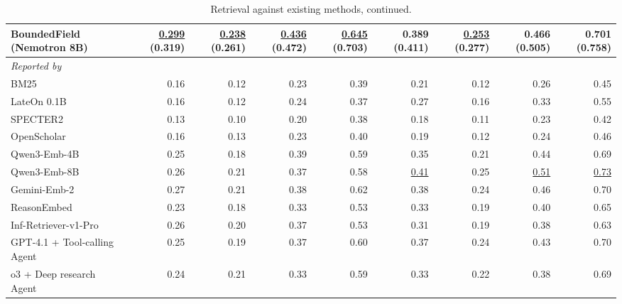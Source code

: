\begin{table}[t]
\begin{subtable}{\textwidth}
\begin{tabular}{lrrrrrrrr}
BoundedField (Nemotron 8B) & \underline{\textbf{0.299}} (0.319) & \underline{\textbf{0.238}} (0.261) & \underline{\textbf{0.436}} (0.472) & \underline{\textbf{0.645}} (0.703) & \textbf{0.389} (0.411) & \underline{\textbf{0.253}} (0.277) & \textbf{0.466} (0.505) & \textbf{0.701} (0.758) \\
\midrule
\multicolumn{9}{l}{\textit{Reported by \citet{kim2026scholarcatalyst}}} \\
BM25 & 0.16 & 0.12 & 0.23 & 0.39 & 0.21 & 0.12 & 0.26 & 0.45 \\
LateOn 0.1B & 0.16 & 0.12 & 0.24 & 0.37 & 0.27 & 0.16 & 0.33 & 0.55 \\
SPECTER2 & 0.13 & 0.10 & 0.20 & 0.38 & 0.18 & 0.11 & 0.23 & 0.42 \\
OpenScholar & 0.16 & 0.13 & 0.23 & 0.40 & 0.19 & 0.12 & 0.24 & 0.46 \\
Qwen3-Emb-4B & 0.25 & 0.18 & 0.39 & 0.59 & 0.35 & 0.21 & 0.44 & 0.69 \\
Qwen3-Emb-8B & 0.26 & 0.21 & 0.37 & 0.58 & \underline{0.41} & 0.25 & \underline{0.51} & \underline{0.73} \\
Gemini-Emb-2 & 0.27 & 0.21 & 0.38 & 0.62 & 0.38 & 0.24 & 0.46 & 0.70 \\
ReasonEmbed & 0.23 & 0.18 & 0.33 & 0.53 & 0.33 & 0.19 & 0.40 & 0.65 \\
Inf-Retriever-v1-Pro & 0.26 & 0.20 & 0.37 & 0.53 & 0.31 & 0.19 & 0.38 & 0.63 \\
GPT-4.1 + Tool-calling Agent & 0.25 & 0.19 & 0.37 & 0.60 & 0.37 & 0.24 & 0.43 & 0.70 \\
o3 + Deep research Agent & 0.24 & 0.21 & 0.33 & 0.59 & 0.33 & 0.22 & 0.38 & 0.69 \\
\bottomrule
\end{tabular}
\end{subtable}
\caption[]{Retrieval against existing methods, continued.}
\end{table}
